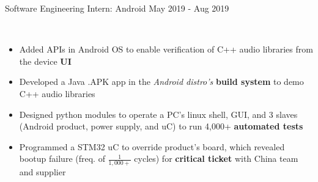 \documentclass[a4paper]{article}
\begin{document}
{Software Engineering Intern: Android \hfill May 2019 - Aug 2019\\
\vspace{-2mm}
	\item[]
	\\
\vspace{-1mm}
\begin{itemize} \itemsep 1pt
    \item Added APIs in Android OS  to enable verification of C++ audio libraries from the device \textbf{UI}
    \item Developed a Java .APK app in the \textit{Android distro's} \textbf{build system} to demo C++ audio libraries
    \item Designed python modules to operate a PC's linux shell, GUI, and 3 slaves (Android product, power supply, and uC) to run 4,000+ \textbf{automated tests}
    		  \item Programmed a STM32 uC to override product's board, which revealed bootup failure (freq. of $\frac{1}{1,000+}$ cycles) for \textbf{critical ticket} with China team and supplier
\end{itemize}


}
\end{document}
